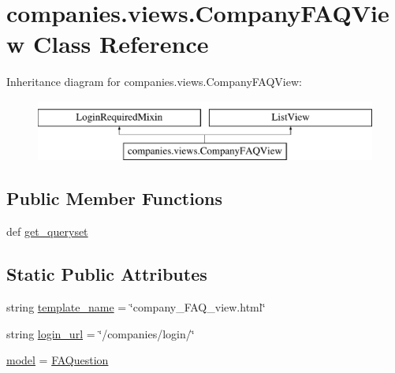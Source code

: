 \hypertarget{classcompanies_1_1views_1_1_company_f_a_q_view}{\section{companies.\-views.\-Company\-F\-A\-Q\-View Class Reference}
\label{classcompanies_1_1views_1_1_company_f_a_q_view}
}
Inheritance diagram for companies.\-views.\-Company\-F\-A\-Q\-View\-:\begin{figure}[H]
\begin{center}
\leavevmode
\includegraphics[height=2.000000cm]{classcompanies_1_1views_1_1_company_f_a_q_view}
\end{center}
\end{figure}
\subsection*{Public Member Functions}
\begin{DoxyCompactItemize}
\item 
def \hyperlink{classcompanies_1_1views_1_1_company_f_a_q_view_a5746d0d9f28679dbdcb586c499f56e23}{get\-\_\-queryset}
\end{DoxyCompactItemize}
\subsection*{Static Public Attributes}
\begin{DoxyCompactItemize}
\item 
string \hyperlink{classcompanies_1_1views_1_1_company_f_a_q_view_a34965c7cafb7c95ee3a1f4abc9b6d3ac}{template\-\_\-name} = \char`\"{}company\-\_\-\-F\-A\-Q\-\_\-view.\-html\char`\"{}
\item 
string \hyperlink{classcompanies_1_1views_1_1_company_f_a_q_view_a1c946844c06beee8118e49ea30c981d9}{login\-\_\-url} = \char`\"{}/companies/login/\char`\"{}
\item 
\hyperlink{classcompanies_1_1views_1_1_company_f_a_q_view_a9a867a5bce7bf501cd4b8eba209bc589}{model} = \hyperlink{classqueries_1_1models_1_1_f_a_question}{F\-A\-Question}
\end{DoxyCompactItemize}


